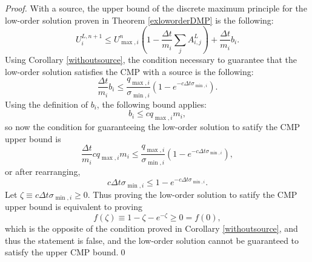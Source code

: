 \begin{proof}
With a source, the upper bound of the discrete maximum principle for the low-order solution
proven in Theorem \ref{exloworderDMP} is the following:
\[
   U_i^{L,n+1}\leq
   U_{\max,i}^n\left(1-\frac{\Delta t}{m_i}\sum\limits_j A^L_{i,j}\right) + \frac{\Delta t}{m_i}b_i.
\]
Using Corollary \ref{withoutsource}, the condition necessary to guarantee that
the low-order solution satisfies the CMP with a source is the following:
\[
   \frac{\Delta t}{m_i}b_i \le \frac{q_{\max,i}}{\sigma_{\min,i}}(1-e^{-c\Delta t\sigma_{\min,i}}).
\]
Using the definition of $b_i$, the following bound applies:
\[
   b_i \le c q_{\max,i} m_i,
\]
so now the condition for guaranteeing the low-order solution to satify the CMP upper bound is
\[
   \frac{\Delta t}{m_i}c q_{\max,i} m_i \le
   \frac{q_{\max,i}}{\sigma_{\min,i}}(1-e^{-c\Delta t\sigma_{\min,i}}),
\]
or after rearranging,
\[
   c\Delta t\sigma_{\min,i} \le
   1-e^{-c\Delta t\sigma_{\min,i}}.
\]
Let $\zeta\equiv c\Delta t\sigma_{\min,i}\ge 0$. Thus proving the low-order solution to
satify the CMP upper bound is equivalent to proving
\[
   f(\zeta)\equiv 1-\zeta-e^{-\zeta} \ge 0 = f(0),
\]
which is the opposite of the condition proved in Corollary \ref{withoutsource},
and thus the statement is false, and the low-order solution cannot be
guaranteed to satisfy the upper CMP bound.\qed
\end{proof}
